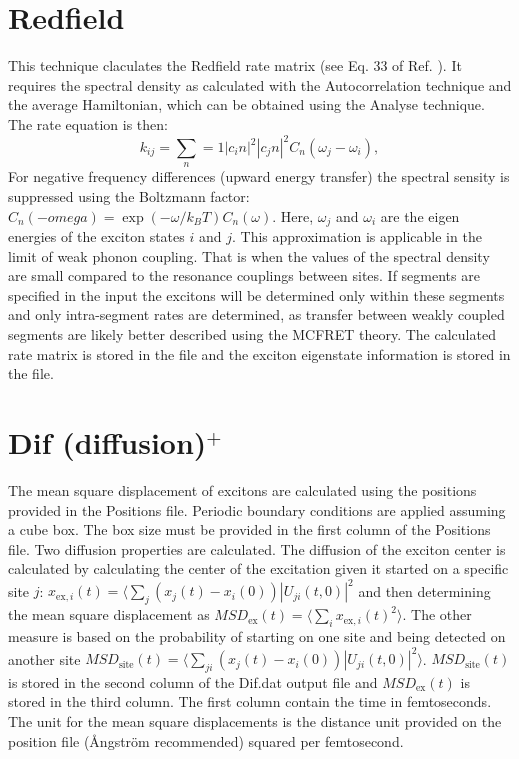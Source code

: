 \section{Redfield}
This technique claculates the Redfield rate matrix (see Eq. 33 of Ref. ).
It requires the spectral density as calculated with the Autocorrelation technique and the average Hamiltonian, which can be obtained using the Analyse technique.
The rate equation is then:
\begin{equation}
	k_{ij}=\sum_n=1 |c_in|^2|c_jn|^2 C_n(\omega_j-\omega_i),
\end{equation}
For negative frequency differences (upward energy transfer) the spectral sensity is suppressed using the Boltzmann factor: $C_n(-omega)=\exp(-\omega/k_B T)C_n(\omega)$.
Here, $\omega_j$ and $\omega_i$ are the eigen energies of the exciton states $i$ and $j$.
This approximation is applicable in the limit of weak phonon coupling.
That is when the values of the spectral density are small compared to the resonance couplings between sites.
If segments are specified in the input the excitons will be determined only within these segments and only intra-segment rates are determined,
as transfer between weakly coupled segments are likely better described using the MCFRET theory. 
The calculated rate matrix is stored in the file  and the exciton eigenstate information is
stored in the  file.

\section{Dif (diffusion)$^{+}$}
The mean square displacement of excitons are calculated using the positions provided in the Positions file. Periodic boundary conditions are applied assuming a cube box. The box size must be provided in the first column of the Positions file.
Two diffusion properties are calculated. The diffusion of the exciton center is calculated by calculating the center of the excitation given it started on a specific site $j$: $x_{\textrm{ex},i}(t)=\langle \sum_j (x_j(t)-x_i(0)) |U_{ji}(t,0)|^2$ and then determining the mean square displacement as $MSD_{\textrm{ex}}(t)=\langle \sum_i  x_{\textrm{ex},i}(t)^2\rangle$. The other measure is based on the probability of starting on one site and being detected on another site $MSD_{\textrm{site}}(t)=\langle \sum_{ji} (x_j(t)-x_i(0))|U_{ji}(t,0)|^2\rangle$. $MSD_{\textrm{site}}(t)$ is stored in the second column of the Dif.dat output file and $MSD_{\textrm{ex}}(t)$ is stored in the third column. The first column contain the time in femtoseconds. The unit for the mean square displacements is the distance unit provided on the position file (\AA ngstr\"{o}m recommended) squared per femtosecond. 
